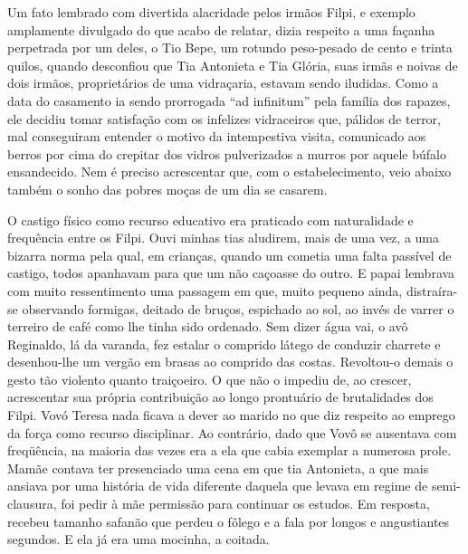 Um fato lembrado com divertida alacridade pelos irmãos Filpi, e exemplo amplamente divulgado do que acabo de relatar, dizia respeito a uma façanha perpetrada por um deles, o Tio Bepe, um rotundo peso-pesado de cento e trinta quilos, quando desconfiou que Tia Antonieta e Tia Glória, suas irmãs e noivas de dois irmãos, proprietários de uma vidraçaria, estavam sendo iludidas. 
Como a data do casamento ia sendo prorrogada ``ad infinitum'' pela família dos rapazes, ele decidiu tomar satisfação com os infelizes vidraceiros que, pálidos de terror, mal conseguiram entender o motivo da intempestiva visita, comunicado aos berros por cima do crepitar dos vidros pulverizados a murros por aquele búfalo ensandecido. 
Nem é preciso acrescentar que, com o estabelecimento, veio abaixo também o sonho das pobres moças de um dia se casarem. 

O castigo físico como recurso educativo era praticado com naturalidade e frequência entre os Filpi. 
Ouvi minhas tias aludirem, mais de uma vez, a uma bizarra norma pela qual, em crianças, quando um cometia uma falta passível de castigo, todos apanhavam para que um não caçoasse do outro. 
E papai lembrava com muito ressentimento uma passagem em que, muito pequeno ainda, distraíra-se observando formigas, deitado de bruços, espichado ao sol, ao invés de varrer o terreiro de café como lhe tinha sido ordenado.  
Sem dizer água vai, o avô Reginaldo, lá da varanda, fez estalar o comprido látego de conduzir charrete e desenhou-lhe um vergão em brasas ao comprido das costas. 
Revoltou-o demais o gesto tão violento quanto traiçoeiro. 
O que não o impediu de, ao crescer, acrescentar sua própria contribuição ao longo prontuário de brutalidades dos Filpi. 
Vovó Teresa nada ficava a dever ao marido no que diz respeito ao emprego da força como recurso disciplinar. 
Ao contrário, dado que Vovô se ausentava com freqüência, na maioria das vezes era a ela que cabia exemplar a numerosa prole. 
Mamãe contava ter presenciado uma cena em que tia Antonieta, a que mais ansiava por uma história de vida diferente daquela que levava em regime de semi-clausura, foi pedir à mãe permissão para continuar os estudos. 
Em resposta, recebeu tamanho safanão que perdeu o fôlego e a fala por longos e angustiantes segundos. 
E ela já era uma mocinha, a coitada.

